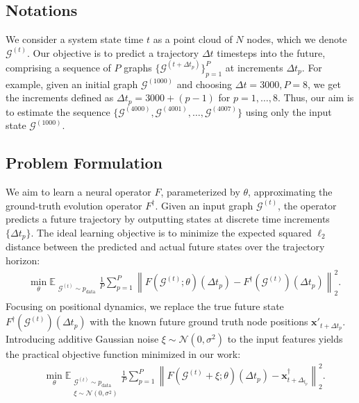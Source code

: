 \subsection{Notations}
We consider a system state time \(t\) as a point cloud of \(N\) nodes, which we denote $\mathcal{G}^{(t)}$. Our objective is to predict a trajectory $\Delta t$ timesteps into the future, comprising a sequence of $P$ graphs $\{\mathcal{G}^{(t+\Delta t_p)}\}_{p=1}^{P}$ at increments $\Delta t_p$. For example, given an initial graph $\mathcal{G}^{(1000)}$ and choosing \(\Delta t = 3000, P=8\), we get the increments defined as $\Delta t_p = 3000 + (p-1)$ for $p = 1,\dots,8$. Thus, our aim is to estimate the sequence \(\{\mathcal{G}^{(4000)}, \mathcal{G}^{(4001)}, \dots, \mathcal{G}^{(4007)}\}\) using only the input state $\mathcal{G}^{(1000)}$.

\subsection{Problem Formulation}
We aim to learn a neural operator $F$, parameterized by $\theta$, approximating the ground-truth evolution operator $F^\dagger$. Given an input graph $\mathcal{G}^{(t)}$, the operator predicts a future trajectory by outputting states at discrete time increments \(\{ \Delta t_p \}\). The ideal learning objective is to minimize the expected squared $\ell_2$ distance between the predicted and actual future states over the trajectory horizon:
\begin{align}
    &\min_{\theta}\mathbb{E}_{\substack{
            \mathcal{G}^{(t)} \sim p_\text{data} \\
            }
        } \frac{1}{P} \sum_{p=1}^P
         \left\|
            F\left( \mathcal{G}^{(t)} ; \theta \right)(\Delta t_p) - F^\dagger \left (\mathcal{G}^{(t)} \right) (\Delta t_p)
        \right\|_{2}^{2}.
        \label{eq:objective_function}
\end{align}
Focusing on positional dynamics, we replace the true future state $F^\dagger(\mathcal{G}^{(t)})(\Delta t_p)$ with the known future ground truth node positions $\mathbf{x}'_{t+\Delta t_p}$. Introducing additive Gaussian noise $\xi \sim \mathcal{N}(0, \sigma^2)$ to the input features yields the practical objective function minimized in our work:
\begin{align}
    &\min_{\theta}\mathbb{E}_{\substack{
            \mathcal{G}^{(t)} \sim p_\text{data} \\
            \xi \sim \mathcal{N}(0, \sigma^2)
            }
        } \frac{1}{P} \sum_{p=1}^P
         \left\|
            F\left( \mathcal{G}^{(t)} + \xi ; \theta \right)(\Delta t_p) - \mathbf{x}^\dagger_{t+\Delta_{t_p}}
        \right\|_{2}^{2}.
        \label{eq:practical_objective_function}
\end{align}

